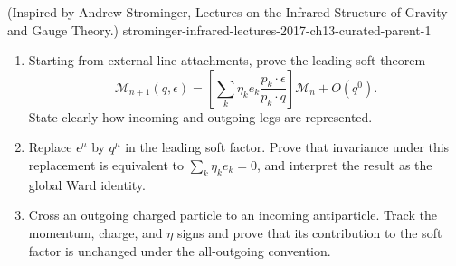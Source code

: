 \begin{enumerate}
  {(Inspired by Andrew Strominger, Lectures on the Infrared Structure of Gravity and Gauge Theory.)}
  {strominger-infrared-lectures-2017-ch13-curated-parent-1}
\begin{enumerate}
\item
Starting from external-line attachments, prove the leading soft theorem
\[
 \mathcal M_{n+1}(q,\epsilon)=
 \left[\sum_k\eta_k e_k\frac{p_k\cdot\epsilon}{p_k\cdot q}\right]
 \mathcal M_n+O(q^0).
\]
State clearly how incoming and outgoing legs are represented.
\item
Replace \(\epsilon^\mu\) by \(q^\mu\) in the leading soft factor.  Prove
that invariance under this replacement is equivalent to
\(\sum_k\eta_ke_k=0\), and interpret the result as the global Ward identity.
\item
Cross an outgoing charged particle to an incoming antiparticle.  Track the
momentum, charge, and \(\eta\) signs and prove that its contribution to the
soft factor is unchanged under the all-outgoing convention.
\end{enumerate}


\end{enumerate}
